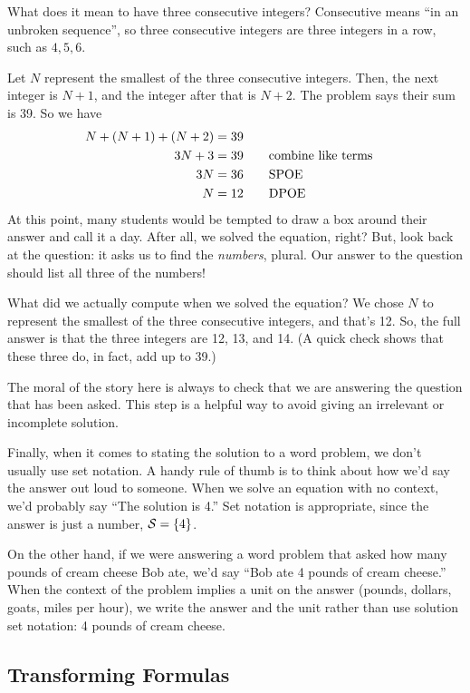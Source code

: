 What does it mean to have three consecutive integers? Consecutive means ``in an unbroken sequence'', so three consecutive integers are three integers in a row, such as $4, 5, 6$.

Let $N$ represent the smallest of the three consecutive integers. Then, the next integer is $N+1$, and the integer after that is $N+2$. The problem says their sum is 39. So we have
\[\begin{aligned}
N + (N+1) + (N+2) &=  39\\
3N + 3 &= 39
&& \text{\quad combine like terms}\\
3N &= 36
&& \text{\quad SPOE}\\
N &= 12
&& \text{\quad DPOE}\\
\end{aligned}\]
At this point, many students would be tempted to draw a box around their answer and call it a day. After all, we solved the equation, right? But, look back at the question: it asks us to find the \textit{numbers}, plural. Our answer to the question should list all three of the numbers!

What did we actually compute when we solved the equation? We chose $N$ to represent the smallest of the three consecutive integers, and that's 12. So, the full answer is that the three integers are 12, 13, and 14. (A quick check shows that these three do, in fact, add up to 39.)

The moral of the story here is always to check that we are answering the question that has been asked. This step is a helpful way to avoid giving an irrelevant or incomplete solution.

Finally, when it comes to stating the solution to a word problem, we don't usually use set notation. A handy rule of thumb is to think about how we'd say the answer out loud to someone. When we solve an equation with no context, we'd probably say ``The solution is 4.'' Set notation is appropriate, since the answer is just a number, $\mathcal{S}=\left\{4\right\}$.

On the other hand, if we were answering a word problem that asked how many pounds of cream cheese Bob ate, we'd say ``Bob ate 4 pounds of cream cheese.'' When the context of the problem implies a unit on the answer (pounds, dollars, goats, miles per hour), we write the answer and the unit rather than use solution set notation: 4 pounds of cream cheese.

\subsection{Transforming Formulas}
\label{sec:transformingformulas}

